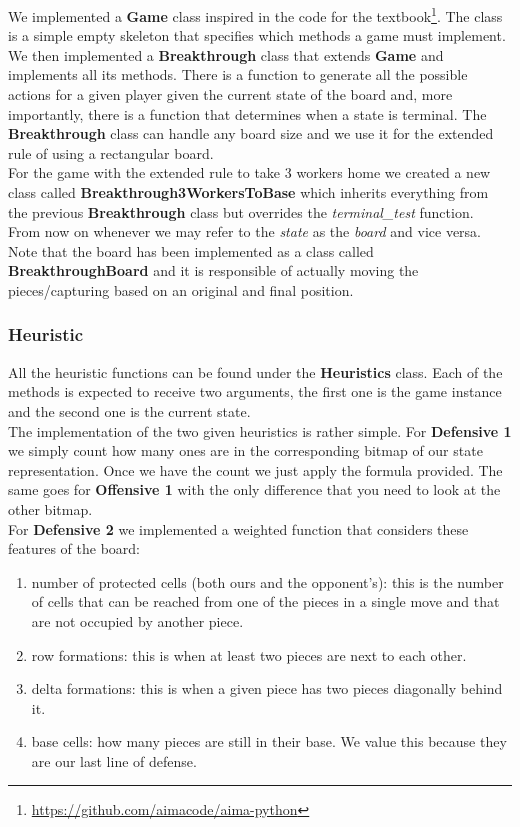 \documentclass[11pt]{article}
\begin{document}
We implemented a \textbf{Game} class inspired in the code for the textbook\footnote{\url{https://github.com/aimacode/aima-python}}. The class is a simple empty skeleton that specifies which methods a game must implement. We then implemented a \textbf{Breakthrough} class that extends \textbf{Game} and implements all its methods. There is a function to generate all the possible actions for a given player given the current state of the board and, more importantly, there is a function that determines when a state is terminal. The \textbf{Breakthrough} class can handle any board size and we use it for the extended rule of using a rectangular board.\\

For the game with the extended rule to take 3 workers home we created a new class called \textbf{Breakthrough3WorkersToBase} which inherits everything from the previous \textbf{Breakthrough} class but overrides the \textit{terminal\_test} function.\\

From now on whenever we may refer to the \textit{state} as the \textit{board} and vice versa. Note that the board has been implemented as a class called \textbf{BreakthroughBoard} and it is responsible of actually moving the pieces/capturing based on an original and final position.


\subsubsection*{Heuristic}
All the heuristic functions can be found under the \textbf{Heuristics} class. Each of the methods is expected to receive two arguments, the first one is the game instance and the second one is the current state. \\

The implementation of the two given heuristics is rather simple. For \textbf{Defensive 1} we simply count how many ones are in the corresponding bitmap of our state representation. Once we have the count we just apply the formula provided. The same goes for \textbf{Offensive 1} with the only difference that you need to look at the other bitmap. \\

For \textbf{Defensive 2} we implemented a weighted function that considers these features of the board:
\begin{enumerate}
\item number of protected cells (both ours and the opponent's): this is the number of cells that can be reached from one of the pieces in a single move and that are not occupied by another piece.
\item row formations: this is when at least two pieces are next to each other.
\item delta formations: this is when a given piece has two pieces diagonally behind it.
\item base cells: how many pieces are still in their base. We value this because they are our last line of defense.
\end{enumerate}
\end{document}
